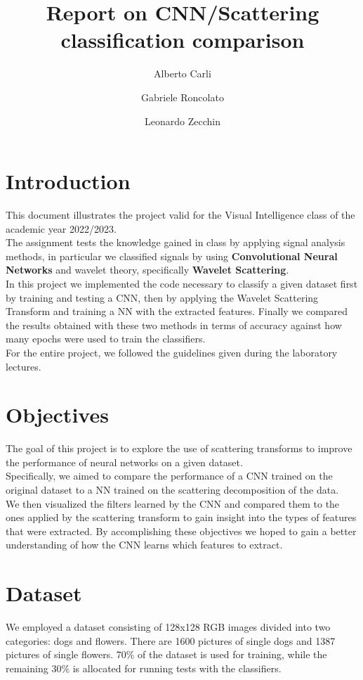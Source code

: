 \documentclass{report}
\title{Report on CNN/Scattering classification comparison}
\author{Alberto Carli \and Gabriele Roncolato \and Leonardo Zecchin }
\date{}
\begin{document}
\maketitle
\tableofcontents
\pagebreak

\chapter{Introduction}
This document illustrates the project valid for the Visual Intelligence class of the academic year 2022/2023. \\
The assignment tests the knowledge gained in class by applying signal analysis methods, in particular we classified signals by using \textbf{Convolutional Neural Networks} and wavelet theory, specifically  \textbf{Wavelet Scattering}. \\
In this project we implemented the code necessary to classify a given dataset first by training and testing a CNN, then by applying the Wavelet Scattering Transform and training a NN with the extracted features.
Finally we compared the results obtained with these two methods in terms of accuracy against how many epochs were used to train the classifiers. \\
For the entire project, we followed the guidelines given during the laboratory lectures.


\chapter{Objectives}
The goal of this project is to explore the use of scattering transforms to improve the performance of neural networks on a given dataset.\\
Specifically, we aimed to compare the performance of a CNN trained on the original dataset to a NN trained on the scattering decomposition of the data.\\

We then visualized the filters learned by the CNN and compared them to the ones applied by the scattering transform to gain insight into the types of features that were extracted. 
By accomplishing these objectives we hoped to gain a better understanding of how the CNN learns which features to extract.

\chapter{Dataset}
We employed a dataset consisting of 128x128 RGB images divided into two categories: dogs and flowers. There are 1600 pictures of single dogs and 1387 pictures of single flowers.
70\% of the dataset is used for training, while the remaining 30\% is allocated for running tests with the classifiers.
\end{document}
